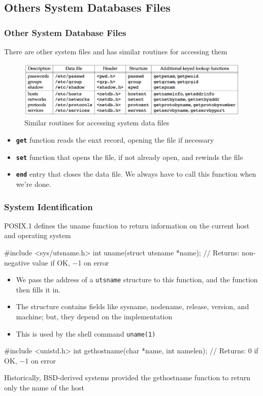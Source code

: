 \documentclass[newPxFont,sthlmFooter,nooffset]{beamer}
\begin{document}
\subsection{Others System Databases Files}

\begin{frame}[t]
  \frametitle{Other System Database Files}
There are other system files and has similar routines for accessing them


\begin{figure}[h]
  \centering
  \includegraphics[width=\textwidth]{figure/fig6-6_similar.png}
  \caption{Similar routines for accessing system data files}
\end{figure}


\begin{itemize}
\item \textbf{\texttt{get}} function reads the enxt record, opening the file if necessary
\item \textbf{\texttt{set}} function that opens the file, if not already open, and rewinds the file
\item \textbf{\texttt{end}} entry that closes the data file. We always have to call this function when we're done.
\end{itemize}

\end{frame}


\begin{frame}[containsverbatim,t]
  \frametitle{System Identification}
POSIX.1 defines the uname function to return information on the current host and operating system

\begin{codedef}
#include <sys/utsname.h>
int uname(struct utsname *name);
// Returns: non-negative value if OK, −1 on error  
\end{codedef}

{\footnotesize
  \begin{itemize}
  \item We pass the address of a \texttt{utsname} structure to this function, and the function then fills it in.
  \item The structure contains fields like sysname, nodename, release, version, and machine; but, they depend on the implementation
  \item This is used by the shell command \texttt{uname(1)}
  \end{itemize}
}


\begin{codedef}
#include <unistd.h>
int gethostname(char *name, int namelen);
// Returns: 0 if OK, −1 on error
\end{codedef}
Historically, BSD-derived systems provided the gethostname function to return only the name of the host


\end{frame}
\end{document}
